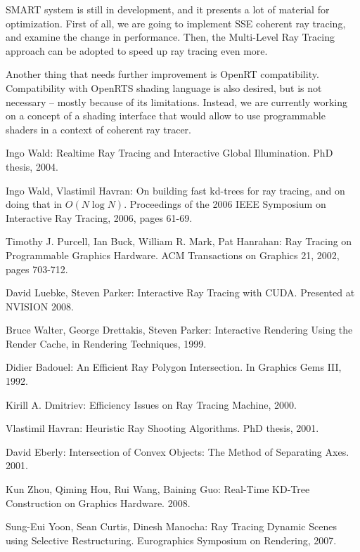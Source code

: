 \documentclass{article}
\begin{document}
SMART system is still in development, and it presents a lot of material for optimization. First of all, we are going to implement SSE coherent ray tracing, and examine the change in performance. Then, the Multi-Level Ray Tracing approach \cite{reshetov05} can be adopted to speed up ray tracing even more.

Another thing that needs further improvement is OpenRT compatibility. Compatibility with OpenRTS shading language is also desired, but is not necessary -- mostly because of its limitations. Instead, we are currently working on a concept of a shading interface that would allow to use programmable shaders in a context of coherent ray tracer.


\newpage
\begin{thebibliography}{1}

Ingo Wald: Realtime Ray Tracing and Interactive Global Illumination. PhD thesis, 2004.

Ingo Wald, Vlastimil Havran: On building fast kd-trees for ray tracing, and on doing that in $O(N\log{N})$. Proceedings of the 2006 IEEE Symposium on Interactive Ray Tracing, 2006, pages 61-69.

Timothy J. Purcell, Ian Buck, William R. Mark, Pat Hanrahan: Ray Tracing on Programmable Graphics Hardware. ACM Transactions on Graphics 21, 2002, pages 703-712.

David Luebke, Steven Parker: Interactive Ray Tracing with CUDA. Presented at NVISION 2008.

Bruce Walter, George Drettakis, Steven Parker: Interactive Rendering Using the Render Cache, in Rendering Techniques, 1999.

Didier Badouel: An Efficient Ray Polygon Intersection. In Graphics Gems III, 1992.

Kirill A. Dmitriev: Efficiency Issues on Ray Tracing Machine, 2000.

Vlastimil Havran: Heuristic Ray Shooting Algorithms. PhD thesis, 2001.

David Eberly: Intersection of Convex Objects: The Method of Separating Axes. 2001.

Kun Zhou, Qiming Hou, Rui Wang, Baining Guo: Real-Time KD-Tree Construction on Graphics Hardware. 2008.

Sung-Eui Yoon, Sean Curtis, Dinesh Manocha: Ray Tracing Dynamic Scenes using Selective Restructuring. Eurographics Symposium on Rendering, 2007.


\end{thebibliography}
\end{document}
